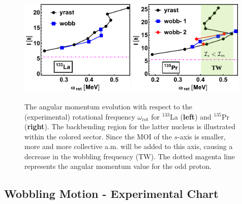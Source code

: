 \begin{figure}
    \begin{center}
        \includegraphics[width=0.49\textwidth]{Chapters/Figures/133La_wob-edited.pdf}
        \includegraphics[width=0.49\textwidth]{Chapters/Figures/135Pr_wob-edited.pdf}
        \caption{The angular momentum evolution with respect to the (experimental) rotational frequency $\omega_\text{rot}$ for $^{133}$La (\textbf{left}) and $^{135}$Pr (\textbf{right}). The backbending region for the latter nucleus is illustrated within the colored sector. Since the MOI of the $s$-axis is smaller, more and more collective a.m. will be added to this axis, causing a decrease in the wobbling frequency (TW). The dotted magenta line represents the angular momentum value for the odd proton.}
        \label{spin-vs-rotationalFreq-133-135}
    \end{center}
\end{figure}

\subsection{Wobbling Motion - Experimental Chart}

